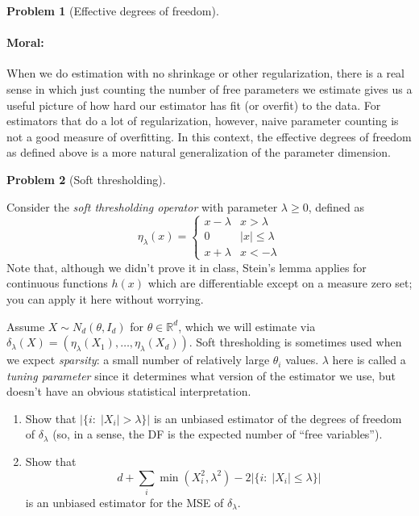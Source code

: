 \documentclass{article}
\newcommand{\RR}{\mathbb{R}}
\theoremstyle{definition}
\newtheorem{problem}{Problem}
\begin{document}
\begin{problem}[Effective degrees of freedom]
\begin{enumerate}[label=(\alph*)]
\end{enumerate}

\paragraph{Moral:} When we do estimation with no shrinkage or other regularization, there is a real sense in which just counting the number of free parameters we estimate gives us a useful picture of how hard our estimator has fit (or overfit) to the data. For estimators that do a lot of regularization, however, naive parameter counting is not a good measure of overfitting. In this context, the effective degrees of freedom as defined above is a more natural generalization of the parameter dimension.
\end{problem}

\begin{problem}[Soft thresholding]
\label{prob:soft-thresh}

Consider the {\em soft thresholding operator} with parameter $\lambda \geq 0$, defined as
\[
\eta_\lambda(x) = 
\begin{cases}
  x - \lambda & x > \lambda\\
  0 & |x| \leq \lambda\\
  x + \lambda & x < -\lambda
\end{cases}
\]
Note that, although we didn't prove it in class, Stein's lemma applies for continuous functions $h(x)$ which are differentiable except on a measure zero set; you can apply it here without worrying.

Assume $X \sim N_d(\theta, I_d)$ for $\theta \in \RR^d$, which we will estimate via $\delta_\lambda(X) = (\eta_\lambda(X_1), \ldots, \eta_\lambda(X_{d}))$. Soft thresholding is sometimes used when we expect {\em sparsity}: a small number of relatively large $\theta_i$ values. $\lambda$ here is called a {\em tuning parameter} since it determines what version of the estimator we use, but doesn't have an obvious statistical interpretation.

\begin{enumerate}[label=(\alph*)]
\item Show that $\left|\{i:\; |X_i| > \lambda\}\right|$ is an unbiased estimator of the degrees of freedom of $\delta_\lambda$ (so, in a sense, the DF is the expected number of ``free variables'').



\item Show that
\[
d + \sum_i \min(X_i^2, \lambda^2) - 2 \left|\{i:\; |X_i| \leq \lambda\}\right|
\]
is an unbiased estimator for the MSE of $\delta_\lambda$.




\end{enumerate}
\end{problem}
\end{document}
